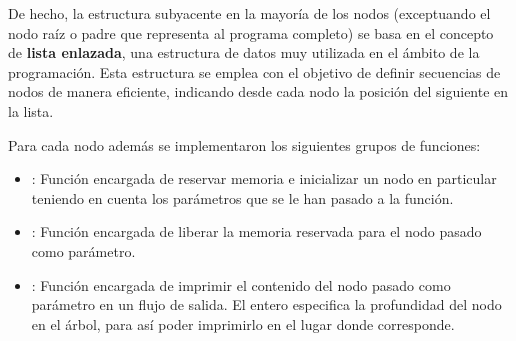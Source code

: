 De hecho, la estructura subyacente en la mayoría de los nodos (exceptuando el nodo raíz o padre que representa al programa completo) se basa en el concepto de \textbf{lista enlazada}, una estructura de datos muy utilizada en el ámbito de la programación. Esta estructura se emplea con el objetivo de definir secuencias de nodos de manera eficiente, indicando desde cada nodo la posición del siguiente en la lista.


\noindent
Para cada nodo además se implementaron los siguientes grupos de funciones:

\begin{itemize}
    \item {} : Función encargada de reservar memoria e inicializar un nodo en particular teniendo en cuenta los parámetros que se le han pasado a la función.
    \item {} : Función encargada de liberar la memoria reservada para el nodo pasado como parámetro.
    \item {} : Función encargada de imprimir el contenido del nodo pasado como parámetro en un flujo de salida. El entero  especifica la profundidad del nodo en el árbol, para así poder imprimirlo en el lugar donde corresponde.
\end{itemize}



